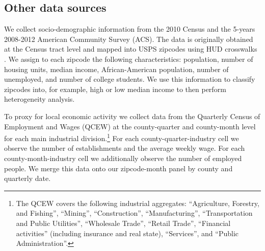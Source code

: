 \subsection{Other data sources}\label{sec:data/other_data}

We collect socio-demographic information from the 2010 Census and the 5-years 2008-2012 
American Community Survey (ACS). The data is originally obtained at the Census tract 
level and mapped into USPS zipcodes using HUD crosswalks \parencite{hudCrosswalks}. We 
assign to each zipcode the following characteristics: population, number of housing units, 
median income, African-American population, number of unemployed, and number of college 
students. We use this information to classify zipcodes into, for example, high or low median 
income to then perform heterogeneity analysis.

To proxy for local economic activity we collect data from the Quarterly Census of 
Employment and Wages (QCEW) at the county-quarter and county-month level for each main 
industrial division.\footnote{The QCEW covers the following industrial aggregates: 
	``Agriculture, Forestry, and Fishing'', ``Mining'', ``Construction'', ``Manufacturing'', 
	``Transportation and Public Utilities'', ``Wholesale Trade'', ``Retail Trade'',
	``Financial activities'' (including insurance and real state), ``Services'', and 
	``Public Administration''.}
For each county-quarter-industry cell we observe the number of establishments and the 
average weekly wage. For each county-month-industry cell we additionally observe the number 
of employed people. We merge this data onto our zipcode-month panel by county and 
quarterly date.



